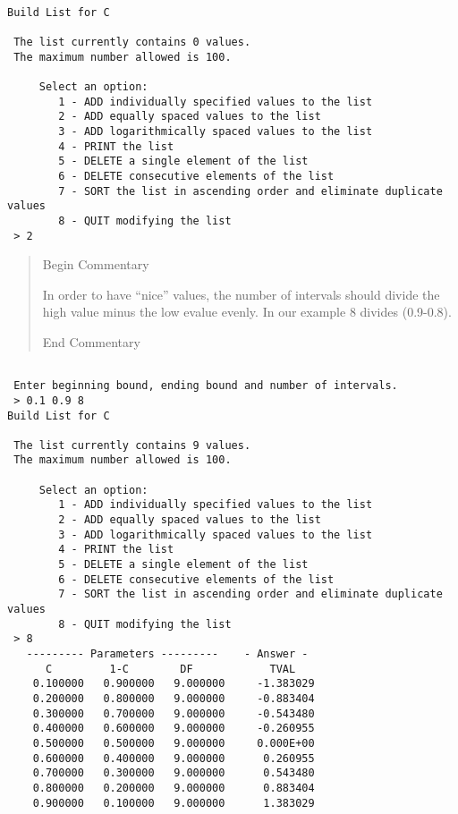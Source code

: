 \documentclass[12pt,dvips]{article}
\newenvironment{commentary}{\begin{quote} \color{Orange}
\begin{center} Begin Commentary\\ \vspace{0.1in} 
\end{center} \color{black} }
{\color{Orange} \begin{center} End Commentary\\ \end{center} \color{black}
      \end{quote} \normalsize }
\begin{document}
\begin{verbatim}

Build List for C

 The list currently contains 0 values.
 The maximum number allowed is 100.

     Select an option:
        1 - ADD individually specified values to the list
        2 - ADD equally spaced values to the list
        3 - ADD logarithmically spaced values to the list
        4 - PRINT the list
        5 - DELETE a single element of the list
        6 - DELETE consecutive elements of the list
        7 - SORT the list in ascending order and eliminate duplicate values
        8 - QUIT modifying the list
 > 2

\end{verbatim}

\begin{commentary}

In order to have ``nice'' values, the number of intervals should
divide the high value minus the low evalue evenly.  In our example
8 divides (0.9-0.8).

\end{commentary}

\begin{verbatim}

 Enter beginning bound, ending bound and number of intervals.
 > 0.1 0.9 8
Build List for C

 The list currently contains 9 values.
 The maximum number allowed is 100.

     Select an option:
        1 - ADD individually specified values to the list
        2 - ADD equally spaced values to the list
        3 - ADD logarithmically spaced values to the list
        4 - PRINT the list
        5 - DELETE a single element of the list
        6 - DELETE consecutive elements of the list
        7 - SORT the list in ascending order and eliminate duplicate values
        8 - QUIT modifying the list
 > 8
   --------- Parameters ---------    - Answer -
      C         1-C        DF            TVAL
    0.100000   0.900000   9.000000     -1.383029
    0.200000   0.800000   9.000000     -0.883404
    0.300000   0.700000   9.000000     -0.543480
    0.400000   0.600000   9.000000     -0.260955
    0.500000   0.500000   9.000000     0.000E+00
    0.600000   0.400000   9.000000      0.260955
    0.700000   0.300000   9.000000      0.543480
    0.800000   0.200000   9.000000      0.883404
    0.900000   0.100000   9.000000      1.383029

\end{verbatim}
\end{document}
